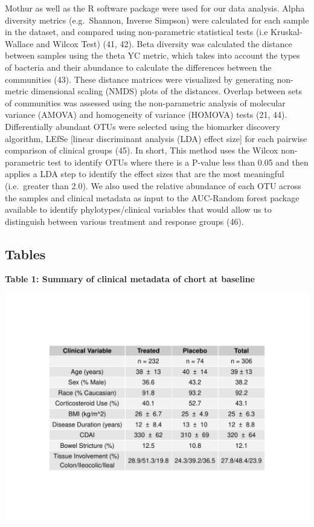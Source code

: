 \documentclass[11pt,]{article}
\begin{document}
Mothur as well as the R software package were used for our data
analysis. Alpha diversity metrics (e.g.~Shannon, Inverse Simpson) were
calculated for each sample in the dataset, and compared using
non-parametric statistical tests (i.e Kruskal-Wallace and Wilcox Test)
(41, 42). Beta diversity was calculated the distance between samples
using the theta YC metric, which takes into account the types of
bacteria and their abundance to calculate the differences between the
communities (43). These distance matrices were visualized by generating
non-metric dimensional scaling (NMDS) plots of the distances. Overlap
between sets of communities was assessed using the non-parametric
analysis of molecular variance (AMOVA) and homogeneity of variance
(HOMOVA) tests (21, 44). Differentially abundant OTUs were selected
using the biomarker discovery algorithm, LEfSe {[}linear discriminant
analysis (LDA) effect size{]} for each pairwise comparison of clinical
groups (45). In short, This method uses the Wilcox non-parametric test
to identify OTUs where there is a P-value less than 0.05 and then
applies a LDA step to identify the effect sizes that are the most
meaningful (i.e.~greater than 2.0). We also used the relative abundance
of each OTU across the samples and clinical metadata as input to the
AUC-Random forest package available to identify phylotypes/clinical
variables that would allow us to distinguish between various treatment
and response groups (46).

\newpage

\subsection{Tables}\label{tables}

\textbf{Table 1: Summary of clinical metadata of chort at baseline}

\includegraphics{tables/SupTable1_baseline_metadata.pdf}
\end{document}
